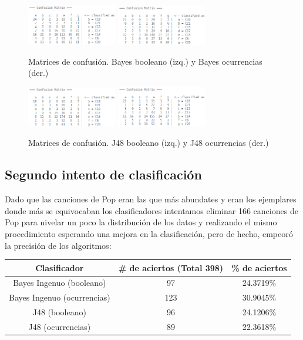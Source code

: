 \documentclass[spanish,11pt,letterpaper]{article}
\begin{document}
\begin{figure}[h]
\centering
\includegraphics[width=0.35\textwidth]{bayes_boolean}
\includegraphics[width=0.35\textwidth]{bayes_counter}
\caption{Matrices de confusión. Bayes booleano (izq.) y Bayes ocurrencias (der.)}
\end{figure}
\begin{figure}[h]
\centering
\includegraphics[width=0.35\textwidth]{j48_boolean}
\includegraphics[width=0.35\textwidth]{j48_counter}
\caption{Matrices de confusión. J48 booleano (izq.) y J48 ocurrencias (der.)}
\end{figure}

\subsection{Segundo intento de clasificación}

Dado que las canciones de Pop eran las que más abundates y eran los ejemplares
donde más se equivocaban los clasificadores intentamos eliminar 166 canciones de
Pop para nivelar un poco la distribución de los datos y realizando el mismo
procedimiento esperando una mejora en la clasificación, pero de hecho, empeoró
la precisión de los algoritmos:

\begin{center}
\begin{tabular}{c | c | c}
Clasificador &  \# de aciertos (Total 398) & \% de aciertos \\
\hline
Bayes Ingenuo (booleano) & 97 & 24.3719\% \\
Bayes Ingenuo (ocurrencias) & 123 & 30.9045\% \\
J48 (booleano) & 96 & 24.1206\% \\
J48 (ocurrencias) & 89 & 22.3618\%
\end{tabular}
\end{center}
\end{document}
